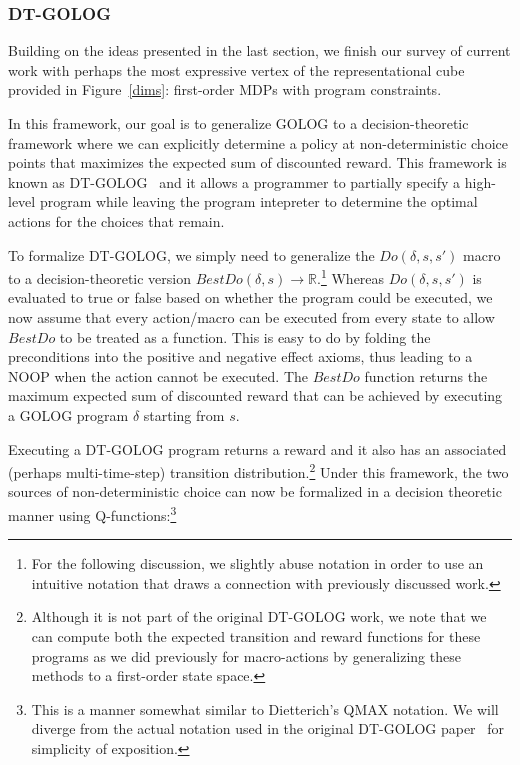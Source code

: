 \subsubsection{DT-GOLOG}

Building on the ideas presented in the last section, we finish our survey of current
work with perhaps the most expressive vertex of the representational cube provided
in Figure~\ref{dims}: first-order MDPs with program constraints.

In this framework, our goal is to generalize GOLOG to a
decision-theoretic framework where we can explicitly determine a
policy at non-deterministic choice points that maximizes the expected sum
of discounted reward.  This framework is known as
DT-GOLOG~\cite{dtgolog} and it allows a programmer to partially
specify a high-level program while leaving the program intepreter to
determine the optimal actions for the choices that remain.

To formalize DT-GOLOG, we simply need to generalize the
$Do(\delta,s,s')$ macro to a decision-theoretic version
$BestDo(\delta,s) \rightarrow \mathbb{R}$.\footnote{For the following
discussion, we slightly
abuse notation in order to use an intuitive notation that draws a connection
with previously discussed work.}  Whereas $Do(\delta,s,s')$ is 
evaluated to true or false based on whether the program could be
executed, we now assume that every action/macro can be executed from
every state to allow $BestDo$ to be treated as a
function.  This is easy to do by folding the preconditions into
the positive and negative effect axioms, thus leading to a NOOP when
the action cannot be executed.  The $BestDo$ function returns the maximum
expected sum of discounted reward that can be achieved by executing a
GOLOG program $\delta$ starting from $s$.

Executing a DT-GOLOG program returns a reward and it also has an associated
(perhaps multi-time-step) transition distribution.\footnote{Although it is not part
of the original DT-GOLOG work, we note that we can compute both the
expected transition and reward functions for these programs as we did
previously for macro-actions by generalizing these methods to a first-order
state space.}  Under this framework, the two sources of non-deterministic
choice can now be formalized in a decision theoretic manner using
Q-functions:\footnote{This is a manner somewhat similar to
Dietterich's QMAX notation.  We will diverge from the actual notation
used in the original DT-GOLOG paper~\cite{dtgolog} for simplicity of
exposition.}

